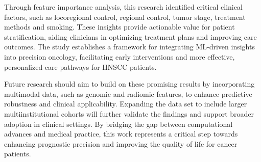 \documentclass[conference]{IEEEtran}
\begin{document}
Through feature importance analysis, this research identified critical clinical factors, such as locoregional control, regional control, tumor stage, treatment methods and smoking. These insights provide actionable value for patient stratification, aiding clinicians in optimizing treatment plans and improving care outcomes. The study establishes a framework for integrating ML-driven insights into precision oncology, facilitating early interventions and more effective, personalized care pathways for HNSCC patients.

Future research should aim to build on these promising results by incorporating multimodal data, such as genomic and radiomic features, to enhance predictive robustness and clinical applicability. Expanding the data set to include larger multiinstitutional cohorts will further validate the findings and support broader adoption in clinical settings. By bridging the gap between computational advances and medical practice, this work represents a critical step towards enhancing prognostic precision and improving the quality of life for cancer patients.
\end{document}
